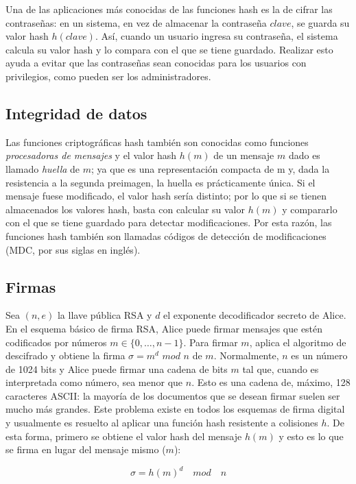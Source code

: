 Una de las aplicaciones más conocidas de las funciones hash es la de
cifrar las contraseñas: en un sistema, en vez de almacenar la contraseña
$clave$, se guarda su valor hash $h(clave)$. Así, cuando un usuario
ingresa su contraseña, el sistema calcula su valor hash y lo compara con
el que se tiene guardado. Realizar esto ayuda a evitar que las
contraseñas sean conocidas para los usuarios con privilegios, como
pueden ser los administradores.

\subsection{Integridad de datos}
Las funciones criptográficas hash también son conocidas como funciones
\textit{procesadoras de mensajes} y el valor hash $h(m)$ de un mensaje
$m$ dado es llamado \textit{huella} de $m$; ya que es una representación
compacta de m y, dada la resistencia a la segunda preimagen, la huella
es prácticamente única. Si el mensaje fuese modificado, el valor hash
sería distinto; por lo que si se tienen almacenados los valores hash,
basta con calcular su valor $h(m)$ y compararlo con el que se tiene
guardado para detectar modificaciones. Por esta razón, las funciones
hash también son llamadas códigos de detección de modificaciones (MDC,
por sus siglas en inglés).

\subsection{Firmas}
Sea $(n, e)$ la llave pública RSA y $d$ el exponente decodificador
secreto de Alice. En el esquema básico de firma RSA, Alice puede firmar
mensajes que estén codificados por números $ m \in \{0, \dots, n-1\}$.
Para firmar $m$, aplica el algoritmo de descifrado y obtiene la firma
$\sigma = m^d$ $mod$ $n$ de $m$.
Normalmente, $n$ es un número de 1024 bits y Alice puede firmar una
cadena de bits $m$ tal que, cuando es interpretada como número, sea
menor que $n$. Esto es una cadena de, máximo, 128 caracteres ASCII: la
mayoría de los documentos que se desean firmar suelen ser mucho más
grandes. Este problema existe en todos los esquemas de firma digital y
usualmente es resuelto al aplicar una función hash resistente a
colisiones $h$.
De esta forma, primero se obtiene el valor hash del mensaje $h(m)$ y
esto es lo que se firma en lugar del mensaje mismo ($m$):

\begin{equation}
  \label{funcion_hash_sign}
  \sigma = h(m)^d \quad mod \quad n
\end{equation}

